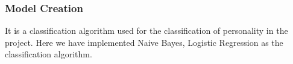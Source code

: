 \subsubsection{Model Creation}
It is a classification algorithm used for the classification of personality in the project. Here we have implemented Naive Bayes, Logistic Regression as the classification algorithm.



